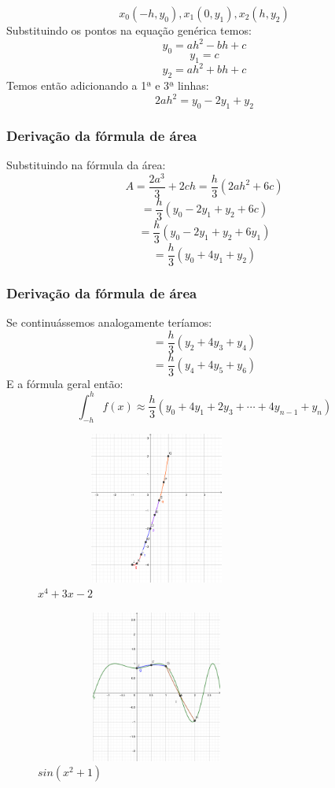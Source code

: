 \documentclass{beamer}
\begin{document}
\begin{frame}
\frametitle{}
$$x_0(-h, y_0), x_1(0,y_1), x_2(h, y_2)$$
Substituindo os pontos na equação genérica temos:
$$ y_0 = ah^2 - bh + c$$
$$y_1 = c$$
$$ y_2 = ah^2 + bh + c$$
Temos então adicionando a 1ª e 3ª linhas:
$$2ah^2 = y_0 - 2y_1 + y_2$$
\end{frame}
\begin{frame}
\frametitle{Derivação da fórmula de área}
Substituindo na fórmula da área:
$$A = \dfrac{2a^3}{3} + 2ch = \dfrac{h}{3} \left( 2ah^2 + 6c \right)$$
$$ = \dfrac{h}{3} \left( y_0 - 2y_1 + y_2 + 6c \right) $$
$$ = \dfrac{h}{3} \left( y_0 - 2y_1 + y_2 + 6y_1 \right) $$
$$ = \dfrac{h}{3} \left( y_0 + 4y_1 + y_2  \right) $$
\end{frame}
\begin{frame}
\frametitle{Derivação da fórmula de área}
Se continuássemos analogamente teríamos:
$$ = \dfrac{h}{3} \left( y_2 + 4y_3 + y_4  \right) $$
$$ = \dfrac{h}{3} \left( y_4 + 4y_5 + y_6  \right) $$
E a fórmula geral então:
$$ \int_{-h}^h f(x) \approx \dfrac{h}{3} \left( y_0 + 4y_1 + 2y_3 + \cdots + 4y_{n-1} + y_n  \right) $$
\end{frame}
\begin{frame}
	\begin{figure}[htb]
	\centering
    	    \includegraphics[width=8cm, height=5cm]{images/x1.png}
       	        \vspace{0.01em}
       	 \caption{$x^4 + 3x - 2$}
	\end{figure}
\end{frame}
\begin{frame}
	\begin{figure}[htb]
	\centering
    	    \includegraphics[width=8cm, height=5cm]{images/x2.png}
       	        \vspace{0.01em}
       	 \caption{$sin(x^2 + 1)$}
	\end{figure}
\end{frame}
\end{document}
